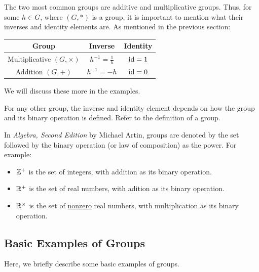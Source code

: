 \documentclass[letterpaper]{article}
\begin{document}
\begin{note*}{}{}
    The two most common groups are additive and multiplicative groups. Thus, for some $h \in G$, where $(G, *)$ is a group, it is important to mention what their inverses and identity elements are. As mentioned in the previous section:
    \begin{center}
        \begin{tabular}{|c|c|c|}
            \hline 
            \textbf{Group} & \textbf{Inverse} & \textbf{Identity} \\ 
            \hline 
            Multiplicative $(G, \times)$ & $h^{-1} = \frac{1}{h}$ & $\operatorname{id} = 1$ \\ 
            Addition $(G, +)$ & $h^{-1} = -h$ & $\operatorname{id} = 0$ \\ 
            \hline 
        \end{tabular}
    \end{center}
    We will discuss these more in the examples. 

    \bigskip 

    For any other group, the inverse and identity element depends on how the group and its binary operation is defined. Refer to the definition of a group.
\end{note*}

\begin{note*}{}{}
    In \emph{Algebra, Second Edition} by Michael Artin, groups are denoted by the set followed by the binary operation (or law of composition) as the power. For example: 
    \begin{itemize}
        \item $\mathbb{Z}^+$ is the set of integers, with addition as its binary operation.
        \item $\mathbb{R}^+$ is the set of real numbers, with adition as its binary operation. 
        \item $\mathbb{R}^{\times}$ is the set of \underline{nonzero} real numbers, with multiplication as its binary operation.
    \end{itemize} 
\end{note*}

\subsection{Basic Examples of Groups}
Here, we briefly describe some basic examples of groups. 
\end{document}

